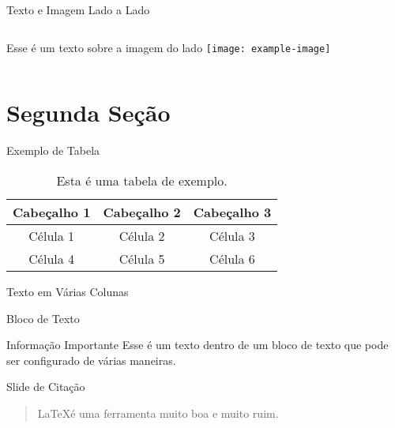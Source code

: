 \documentclass[aspectratio=169]{beamer}
\begin{document}
\begin{frame}{Texto e Imagem Lado a Lado}
    \begin{columns}
            Esse é um texto sobre a imagem do lado
            \texttt{[image: example-image]} %
    \end{columns}
\end{frame}

\section{Segunda Seção}

\begin{frame}{Exemplo de Tabela}
    \begin{table}[htbp]
        \centering
        \begin{tabular}{|c|c|c|}
        \hline
        Cabeçalho 1 & Cabeçalho 2 & Cabeçalho 3 \\
        \hline
        Célula 1  & Célula 2  & Célula 3  \\
        Célula 4  & Célula 5  & Célula 6  \\
        \hline
        \end{tabular}
        \caption{Esta é uma tabela de exemplo.}
    \end{table}
\end{frame}

\begin{frame}{Texto em Várias Colunas}
    \begin{multicols}{2}
        \lipsum[2]
    \end{multicols}
\end{frame}

\begin{frame}{Bloco de Texto}
    \begin{block}{Informação Importante}
        Esse é um texto dentro de um bloco de texto que pode ser configurado de várias maneiras.
    \end{block}
\end{frame}

\begin{frame}{Slide de Citação}
    \begin{quote}
        \LaTeX é uma ferramenta muito boa e muito ruim.
    \end{quote}
\end{frame}
\end{document}
